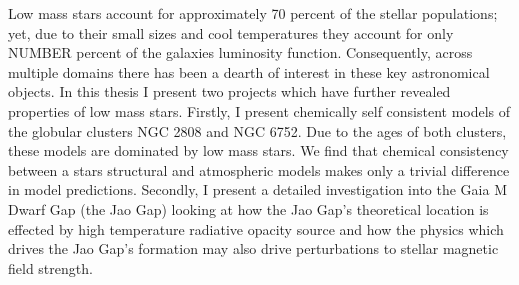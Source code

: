 Low mass stars account for approximately 70 percent of the stellar populations; yet, due to their small sizes and cool temperatures they account for only {\color{red} NUMBER} percent of the galaxies luminosity function. Consequently, across multiple domains there has been a dearth of interest in these key astronomical objects. In this thesis I present two projects which have further revealed properties of low mass stars. Firstly, I present chemically self consistent models of the globular clusters NGC 2808 and NGC 6752. Due to the ages of both clusters, these models are dominated by low mass stars. We find that chemical consistency between a stars structural and atmospheric models makes only a trivial difference in model predictions. Secondly, I present a detailed investigation into the Gaia M Dwarf Gap (the Jao Gap) looking at how the Jao Gap's theoretical location is effected by high temperature radiative opacity source and how the physics which drives the Jao Gap's formation may also drive perturbations to stellar magnetic field strength.
